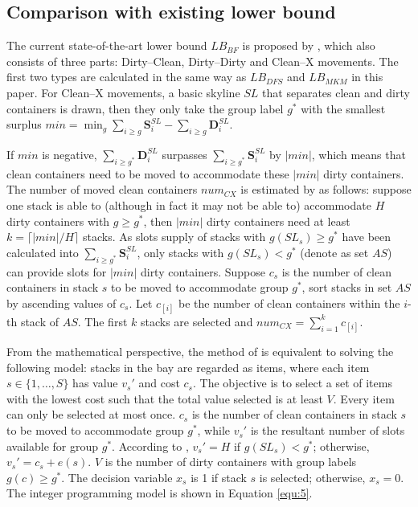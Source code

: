 \documentclass[review,3p,times,authoryear,12pt]{elsarticle}
\begin{document}
\subsection{Comparison with existing lower bound}

The current state-of-the-art lower bound $\mathit{LB}_\mathit{BF}$ is proposed by \cite{BF2012}, which also consists of three parts: Dirty--Clean, Dirty--Dirty and Clean--X movements.
The first two types are calculated in the same way as $\mathit{LB}_\mathit{DFS}$ and $\mathit{LB}_\mathit{MKM}$ in this paper. 
For Clean--X movements, a basic skyline $\mathit{SL}$ that separates clean and dirty containers is drawn, then they only take the group label $g^*$ with the smallest surplus $\mathit{min}=\min_g\sum_{i\ge g}\mathbf S^\mathit{SL}_i-\sum_{i\ge g}\mathbf D^\mathit{SL}_i$. 

If $\mathit{min}$ is negative, $\sum_{i\ge g^*}\mathbf D^\mathit{SL}_i$ surpasses $\sum_{i\ge g^*}\mathbf S^\mathit{SL}_i$ by $|\mathit{min}|$, which means that clean containers need to be moved to accommodate these $|\mathit{min}|$ dirty containers. 
The number of moved clean containers $\mathit{num}_\mathit{CX}$ is estimated by \cite{BF2012} as follows: suppose one stack is able to (although in fact it may not be able to) accommodate $H$ dirty containers with $g\ge g^*$, then $|\mathit{min}|$ dirty containers need at least $k=\big\lceil{|\mathit{min}|}/{H}\big\rceil$ stacks. 
As slots supply of stacks with $g(\mathit{SL}_s)\ge g^*$ have been calculated into $\sum_{i\ge g^*}\mathbf S^\mathit{SL}_i$, only stacks with $g(\mathit{SL}_s)< g^*$ (denote as set $\mathit{AS}$) can provide slots for $|\mathit{min}|$ dirty containers. 
Suppose $c_s$ is the number of clean containers in stack $s$ to be moved to accommodate group $g^*$, sort stacks in set $\mathit{AS}$ by ascending values of $c_s$.
Let $c_{[i]}$ be the number of clean containers within the $i$-th stack of $\mathit{AS}$.
The first $k$ stacks are selected and $\mathit{num}_\mathit{CX}=\sum_{i=1}^{k}c_{[i]}$.

From the mathematical perspective, the method of \cite{BF2012} is equivalent to solving the following model: stacks in the bay are regarded as items, where each item $s\in\{1,\dots,S\}$ has value $v_s'$ and cost $c_s$. 
The objective is to select a set of items with the lowest cost such that the total value selected is at least $V$. 
Every item can only be selected at most once. 
$c_s$ is the number of clean containers in stack $s$ to be moved to accommodate group $g^*$, while $v_s'$ is the resultant number of slots available for group $g^*$. 
According to \cite{BF2012}, $v_s'=H$ if $g(\mathit{SL}_s)<g^*$; otherwise, $v_s'=c_s+e(s)$. 
$V$ is the number of dirty containers with group labels $g(c)\ge g^*$. 
The decision variable $x_s$ is 1 if stack $s$ is selected; otherwise, $x_s=0$. 
The integer programming model is shown in Equation \ref{equ:5}.
\end{document}
